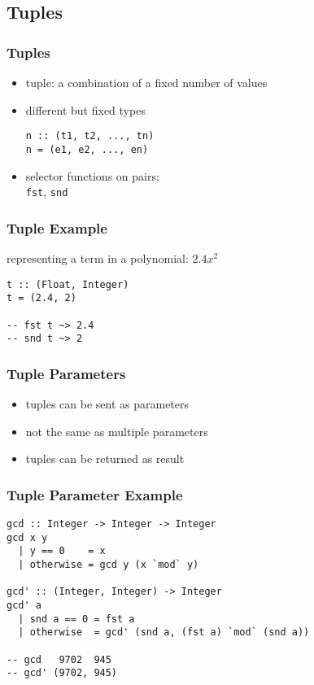 \documentclass[dvipsnames]{beamer}
\theoremstyle{plain}
\begin{document}
\subsection{Tuples}

\begin{frame}[fragile]
  \frametitle{Tuples}

  \begin{itemize}
    \item \alert{tuple}: a combination of a fixed number of values
    \item different but fixed types

    \smallskip
    \begin{lstlisting}[style=syntax]
n :: (t1, t2, ..., tn)
n = (e1, e2, ..., en)
    \end{lstlisting}

    \medskip
    \item selector functions on pairs:\\
      \lstinline|fst|, \lstinline|snd|
  \end{itemize}
\end{frame}

\begin{frame}[fragile]
  \frametitle{Tuple Example}

  \begin{exampleblock}{representing a term in a polynomial: $2.4x^2$}
    \begin{lstlisting}
t :: (Float, Integer)
t = (2.4, 2)

-- fst t ~> 2.4
-- snd t ~> 2
    \end{lstlisting}
  \end{exampleblock}
\end{frame}

\begin{frame}
  \frametitle{Tuple Parameters}

  \begin{itemize}
    \item tuples can be sent as parameters
    \item not the same as multiple parameters

    \bigskip
    \item tuples can be returned as result
  \end{itemize}
\end{frame}

\begin{frame}[fragile]
  \frametitle{Tuple Parameter Example}

  \begin{exampleblock}{}
    \begin{lstlisting}
gcd :: Integer -> Integer -> Integer
gcd x y
  | y == 0    = x
  | otherwise = gcd y (x `mod` y)

gcd' :: (Integer, Integer) -> Integer
gcd' a
  | snd a == 0 = fst a
  | otherwise  = gcd' (snd a, (fst a) `mod` (snd a))

-- gcd   9702  945
-- gcd' (9702, 945)
    \end{lstlisting}
  \end{exampleblock}
\end{frame}
\end{document}
